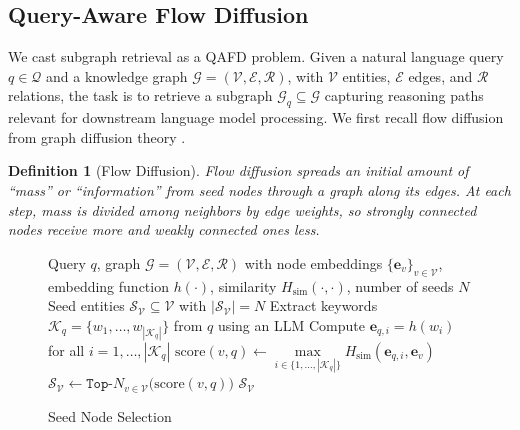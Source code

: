 \documentclass{article} %
\newtheorem{definition}[theorem]{Definition}
\begin{document}
%
\subsection{Query-Aware Flow Diffusion}\label{sec:qafd:detailed}

We cast subgraph retrieval as a QAFD problem.  Given a natural language query $q \in \mathcal{Q}$ and a knowledge graph $\mathcal{G} = (\mathcal{V}, \mathcal{E}, \mathcal{R})$, with $\mathcal{V}$ entities, $\mathcal{E}$ edges, and $\mathcal{R}$ relations, the task is to retrieve a subgraph $\mathcal{G}_q \subseteq \mathcal{G}$ capturing reasoning paths relevant for downstream language model processing. We first recall flow diffusion from graph diffusion theory \citep{lovasz1993random,chung1997spectral,spielman2013local,fountoulakis2023flow}.  
%
\begin{definition}[Flow Diffusion]\label{def:fd}
Flow diffusion spreads an initial amount of “mass” or “information” 
from seed nodes through a graph along its edges. At each step, mass is divided among neighbors by edge weights, so strongly connected nodes receive more and weakly connected ones less.  
\end{definition}

\begin{figure}
\begin{minipage}{0.5\textwidth}
\vspace{-0.7cm}
\begin{algorithm}[H]
\caption{Seed Node Selection}
\label{alg:seed_selection}
\begin{algorithmic}[1]
\Input Query $q$, graph $\mathcal{G}=(\mathcal{V},\mathcal{E},\mathcal{R})$ with node embeddings $\{\boldsymbol{e}_v\}_{v\in\mathcal{V}}$, embedding function $h(\cdot)$, similarity $H_{\mathrm{sim}}(\cdot,\cdot)$, number of seeds $N$
\Output Seed entities $\mathcal{S}_{\mathcal{V}}\subseteq\mathcal{V}$ with $|\mathcal{S}_{\mathcal{V}}|=N$
\State Extract keywords $\mathcal{K}_q=\{w_1,\ldots,w_{|\mathcal{K}_q|}\}$ from $q$ using an LLM
\State Compute $\boldsymbol{e}_{q,i}= h(w_i)$ for all $i=1, \ldots, |\mathcal{K}_q|$
    \State $\text{score}(v,q)\gets \max\limits_{i\in \{1, \ldots, |\mathcal{K}_q|\}} H_{\mathrm{sim}}(\boldsymbol{e}_{q,i},\boldsymbol{e}_v)$ \label{eqn:score}
\EndFor
 \State 
 $\mathcal{S}_{\mathcal{V}} \gets \texttt{Top-}N_{v\in\mathcal{V}}\big(\text{score}(v,q)\big)$
 \label{eqn:seed_selection}
\State \Return $\mathcal{S}_{\mathcal{V}}$
\end{algorithmic}
\end{algorithm}
\vspace{-0.5cm}
\end{minipage}
\end{figure}
\end{document}
